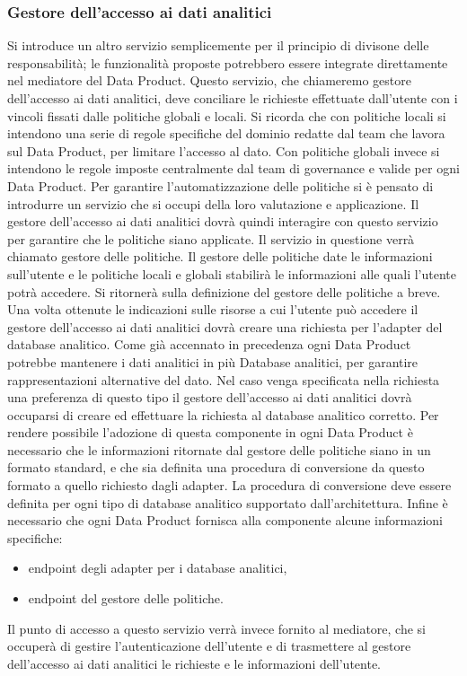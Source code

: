 \documentclass[12pt]{report}
\begin{document}
\subsubsection{Gestore dell'accesso ai dati analitici}
Si introduce un altro servizio semplicemente per il principio di divisone delle responsabilità; le funzionalità proposte potrebbero essere integrate direttamente nel mediatore del Data Product. 
Questo servizio, che chiameremo gestore dell'accesso ai dati analitici, deve conciliare le richieste effettuate dall'utente con i vincoli fissati dalle politiche globali e locali.
Si ricorda che con politiche locali si intendono una serie di regole specifiche del dominio redatte dal team che lavora sul  Data Product, per limitare l'accesso al dato.
Con politiche globali invece si intendono le regole imposte centralmente dal team di governance e valide per ogni Data Product.
Per garantire l'automatizzazione delle politiche si è pensato di introdurre un servizio che si occupi della loro valutazione e applicazione.
Il gestore dell'accesso ai dati analitici dovrà quindi interagire con questo servizio per garantire che le politiche siano applicate.
Il servizio in questione verrà chiamato gestore delle politiche. 
Il gestore delle politiche date le informazioni sull'utente e le politiche locali e globali stabilirà le informazioni alle quali l'utente potrà accedere. 
Si ritornerà sulla definizione del gestore delle politiche a breve.
Una volta ottenute le indicazioni sulle risorse a cui l'utente può accedere il gestore dell'accesso ai dati analitici dovrà creare una richiesta per l'adapter del database analitico.
Come già accennato in precedenza ogni Data Product potrebbe mantenere i dati analitici in più Database analitici, per garantire rappresentazioni alternative del dato.
Nel caso venga specificata nella richiesta una preferenza di questo tipo il gestore dell'accesso ai dati analitici dovrà occuparsi di creare ed effettuare la richiesta al database analitico corretto.
Per rendere possibile l'adozione di questa componente in ogni Data Product è necessario  che le informazioni ritornate dal gestore delle politiche siano in un formato standard, e che sia definita una procedura di conversione da questo formato a quello richiesto dagli adapter.
La procedura di conversione deve essere definita per ogni tipo di database analitico supportato dall'architettura.
Infine è necessario che ogni Data Product fornisca alla componente alcune informazioni specifiche: 
\begin{itemize}
    \item endpoint degli adapter per i database analitici,
    \item endpoint del gestore delle politiche. 
\end{itemize}
Il punto di accesso a questo servizio verrà invece fornito al mediatore, che si occuperà di gestire l'autenticazione dell'utente e di trasmettere al gestore dell'accesso ai dati analitici le richieste e le informazioni dell'utente.
\end{document}
